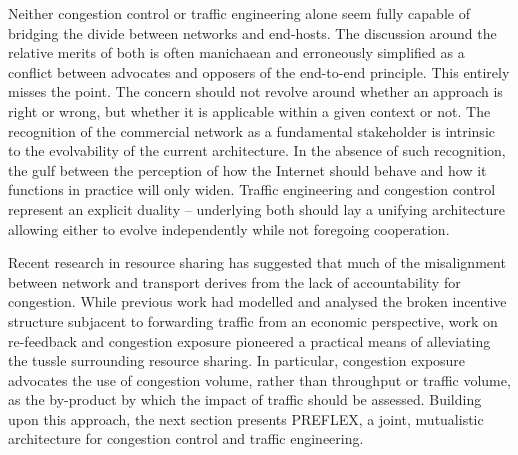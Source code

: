 \begin{description}
\end{description}

Neither congestion control or traffic engineering alone seem fully capable of bridging the divide between networks and end-hosts. 
The discussion around the relative merits of both is often manichaean and erroneously simplified as a conflict between advocates and opposers of the end-to-end principle. 
This entirely misses the point. 
The concern should not revolve around whether an approach is right or wrong, but whether it is applicable within a given context or not. 
The recognition of the commercial network as a fundamental stakeholder is intrinsic to the evolvability of the current architecture. 
In the absence of such recognition, the gulf between the perception of how the Internet should behave and how it functions in practice will only widen. 
Traffic engineering and congestion control represent an explicit duality -- underlying both should lay a unifying architecture allowing either to evolve independently while not foregoing cooperation.

Recent research in resource sharing has suggested that much of the misalignment between network and transport derives from the lack of accountability for congestion.
While previous work had modelled and analysed the broken incentive structure subjacent to forwarding traffic from an economic perspective, work on re-feedback and congestion exposure \cite{Briscoe:2005p346} pioneered a practical means of alleviating the tussle surrounding resource sharing.  
In particular, congestion exposure advocates the use of congestion volume, rather than throughput or traffic volume, as the by-product by which the impact of traffic should be assessed.  
Building upon this approach, the next section presents PREFLEX, a joint, mutualistic architecture for congestion control and traffic engineering. 






